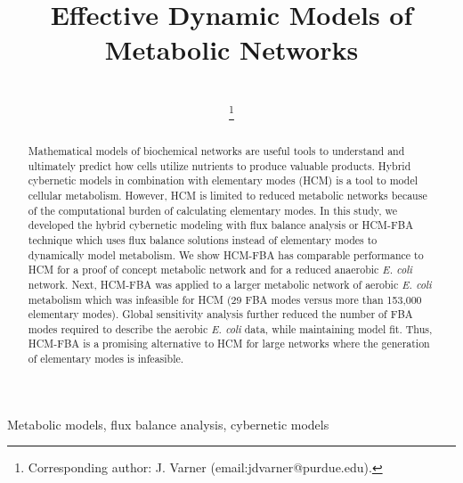 \documentclass[10pt,twocolumn,twoside,final]{IEEEtran}
\begin{document}
\title{Effective Dynamic Models of Metabolic Networks}


\author{\\
\thanks{Corresponding author: J. Varner (email:jdvarner@purdue.edu).}}

\maketitle

\begin{abstract}
Mathematical models of biochemical networks are useful tools to understand and ultimately predict how cells utilize nutrients to produce valuable products.
Hybrid cybernetic models in combination with elementary modes (HCM) is a tool to model cellular metabolism.
However, HCM is limited to reduced metabolic networks because of the computational burden of calculating elementary modes.
In this study, we developed the hybrid cybernetic modeling with flux balance analysis or HCM-FBA technique which uses flux balance solutions instead of elementary modes
to dynamically model metabolism.
We show HCM-FBA has comparable performance to HCM for a proof of concept metabolic network and for a reduced anaerobic \textit{E. coli} network.
Next, HCM-FBA was applied to a larger metabolic network of aerobic \textit{E. coli} metabolism which was infeasible for HCM (29 FBA modes versus more than 153,000 elementary modes).
Global sensitivity analysis further reduced the number of FBA modes required to describe the aerobic \textit{E. coli} data, while maintaining model fit.
Thus, HCM-FBA is a promising alternative to HCM for large networks where the generation of elementary modes is infeasible.

\end{abstract}


\begin{IEEEkeywords}
Metabolic models, flux balance analysis, cybernetic models
\end{IEEEkeywords}
\end{document}
